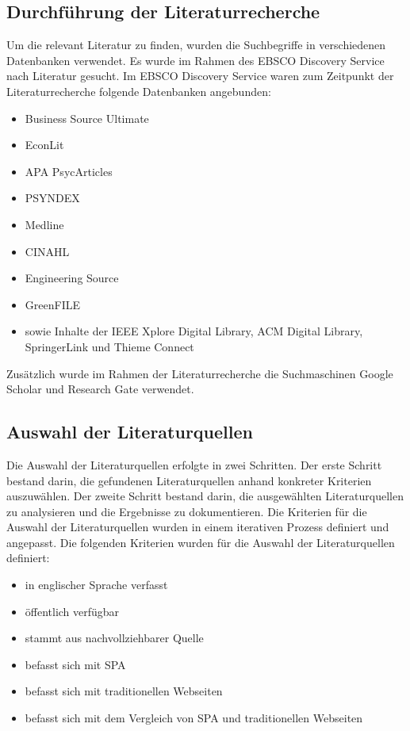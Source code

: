 \subsection{Durchführung der Literaturrecherche}
Um die relevant Literatur zu finden, wurden die Suchbegriffe in verschiedenen Datenbanken verwendet.
Es wurde im Rahmen des EBSCO Discovery Service nach Literatur gesucht.
Im EBSCO Discovery Service waren zum Zeitpunkt der Literaturrecherche folgende Datenbanken angebunden:
\begin{itemize}
    \item Business Source Ultimate
    \item EconLit
    \item APA PsycArticles
    \item PSYNDEX
    \item Medline
    \item CINAHL
    \item Engineering Source
    \item GreenFILE
    \item sowie Inhalte der IEEE Xplore Digital Library, ACM Digital Library, SpringerLink und Thieme Connect
\end{itemize}

Zusätzlich wurde im Rahmen der Literaturrecherche die Suchmaschinen Google Scholar und Research Gate verwendet.

\subsection{Auswahl der Literaturquellen}
Die Auswahl der Literaturquellen erfolgte in zwei Schritten.
Der erste Schritt bestand darin, die gefundenen Literaturquellen anhand konkreter Kriterien auszuwählen.
Der zweite Schritt bestand darin, die ausgewählten Literaturquellen zu analysieren und die Ergebnisse zu dokumentieren.
Die Kriterien für die Auswahl der Literaturquellen wurden in einem iterativen Prozess definiert und angepasst.
Die folgenden Kriterien wurden für die Auswahl der Literaturquellen definiert:
\begin{itemize}
    \item in englischer Sprache verfasst
    \item öffentlich verfügbar
    \item stammt aus nachvollziehbarer Quelle
    \item befasst sich mit \ac{SPA}
    \item befasst sich mit traditionellen Webseiten
    \item befasst sich mit dem Vergleich von \ac{SPA} und traditionellen Webseiten
\end{itemize}


